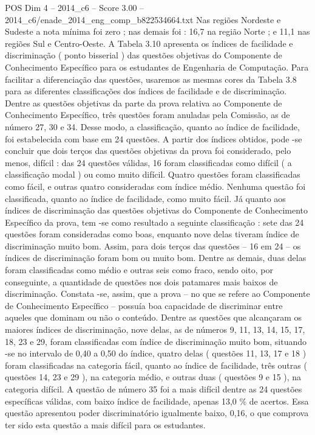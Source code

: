 \begin{textsample}{POS Dim 4 – 2014\_c6 – Score 3.00 – 2014\_c6/enade\_2014\_eng\_comp\_b822534664.txt}
Nas regiões Nordeste e Sudeste a nota mínima foi zero ; nas demais foi : 16,7 na região Norte ; e 11,1 nas regiões Sul e Centro-Oeste.
A Tabela 3.10 apresenta os índices de facilidade e discriminação ( ponto bisserial ) das questões objetivas do Componente de Conhecimento Específico para os estudantes de Engenharia de Computação.
Para facilitar a diferenciação das questões, usaremos as mesmas cores da Tabela 3.8 para as diferentes classificações dos índices de facilidade e de discriminação.
Dentre as questões objetivas da parte da prova relativa ao Componente de Conhecimento Específico, três questões foram anuladas pela Comissão, as de número 27, 30 e 34.
Desse modo, a classificação, quanto ao índice de facilidade, foi estabelecida com base em 24 questões.
A partir dos índices obtidos, pode -se concluir que dois terços das questões objetivas da prova foi considerado, pelo menos, difícil : das 24 questões válidas, 16 foram classificadas como difícil ( a classificação modal ) ou como muito difícil.
Quatro questões foram classificadas como fácil, e outras quatro consideradas com índice médio.
Nenhuma questão foi classificada, quanto ao índice de facilidade, como muito fácil.
Já quanto aos índices de discriminação das questões objetivas do Componente de Conhecimento Específico da prova, tem -se como resultado a seguinte classificação : sete das 24 questões foram consideradas como boas, enquanto nove delas tiveram índice de discriminação muito bom.
Assim, para dois terços das questões – 16 em 24 – os índices de discriminação foram bom ou muito bom.
Dentre as demais, duas delas foram classificadas como médio e outras seis como fraco, sendo oito, por conseguinte, a quantidade de questões nos dois patamares mais baixos de discriminação.
Constata -se, assim, que a prova – no que se refere ao Componente de Conhecimento Específico – possuía boa capacidade de discriminar entre aqueles que dominam ou não o conteúdo.
Dentre as questões que alcançaram os maiores índices de discriminação, nove delas, as de números 9, 11, 13, 14, 15, 17, 18, 23 e 29, foram classificadas com índice de discriminação muito bom, situando -se no intervalo de 0,40 a 0,50 do índice, quatro delas ( questões 11, 13, 17 e 18 ) foram classificadas na categoria fácil, quanto ao índice de facilidade, três outras ( questões 14, 23 e 29 ), na categoria médio, e outras duas ( questões 9 e 15 ), na categoria difícil.
A questão de número 35 foi a mais difícil dentre as 24 questões específicas válidas, com baixo índice de facilidade, apenas 13,0 \% de acertos.
Essa questão apresentou poder discriminatório igualmente baixo, 0,16, o que comprova ter sido esta questão a mais difícil para os estudantes.

\end{textsample}
